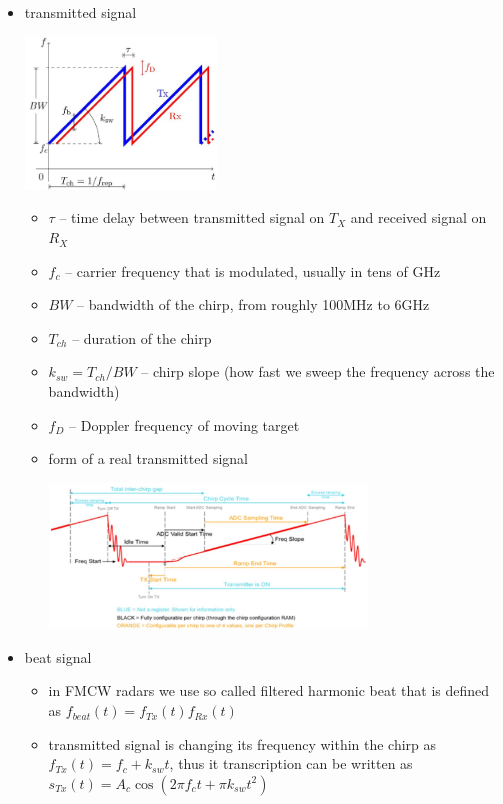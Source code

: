 \documentclass[a4paper,12pt]{report}
\begin{document}
\begin{itemize}
\begin{itemize}
		\end{itemize}
	\item transmitted signal
		\begin{center}
			\includegraphics[width=0.4\textwidth]{./img/fmcw_signal_ft_relation.jpg}
		\end{center}
		\begin{itemize}
			\item $\tau$ -- time delay between transmitted signal on $T_X$ and received signal on $R_X$
			\item $f_c$ -- carrier frequency that is modulated, usually in tens of GHz
			\item $BW$  -- bandwidth of the chirp, from roughly 100MHz to 6GHz
			\item $T_{ch}$ -- duration of the chirp
			\item $k_{sw} = T_{ch}/BW$ -- chirp slope (how fast we sweep the frequency across the bandwidth)
			\item $f_D$ -- Doppler frequency of moving target
			\item form of a real transmitted signal
				\begin{center}
					\includegraphics[width=0.7\textwidth]{./img/fmcw_chirp_shape.jpg}
				\end{center}
		\end{itemize}
	\item beat signal
		\begin{itemize}
			\item in FMCW radars we use so called filtered harmonic beat that is defined as $f_{beat}(t) = f_{Tx}(t)f_{Rx}(t)$
			\item transmitted signal is changing its frequency within the chirp as $f_{Tx}(t) = f_c + k_{sw}t$, thus it transcription can be written as $s_{Tx}(t)= A_c \cos(2\pi f_c t + \pi k_{sw} t^2)$

\end{itemize}
\end{itemize}
\end{document}
